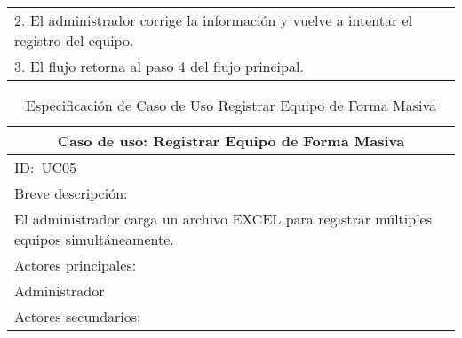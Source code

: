 \documentclass[stu, 12pt, letterpaper, donotrepeattitle, floatsintext, natbib]{apa7}
\begin{document}
\begin{longtable}{@{} p{16.5cm} @{}}
    \hspace{1cm}2. El administrador corrige la informaci\'on y vuelve a intentar el registro del equipo.                                                                                                                                                                                       \\
    \hspace{1cm}3. El flujo retorna al paso 4 del flujo principal.                                                                                                                                                                                                                             \\ \bottomrule
\end{longtable}
\newpage
\begin{longtable}{@{} p{16.5cm} @{}}
    \caption{Especificaci\'on de Caso de Uso Registrar Equipo de Forma Masiva}\label{tab:UC05}                                                                                      \\ \toprule
    \multicolumn{1}{c}{Caso de uso: Registrar Equipo de Forma Masiva}                                                                                                               \\ \midrule
    ID:~UC05                                                                                                                                                                        \\ \midrule
    Breve descripci\'on:                                                                                                                                                            \\
    El administrador carga un archivo EXCEL para registrar m\'ultiples equipos simult\'aneamente.                                                                                   \\ \midrule
    Actores principales:                                                                                                                                                            \\
    Administrador                                                                                                                                                                   \\ \midrule
    Actores secundarios:                                                                                                                                                            \\

\end{longtable}
\end{document}
